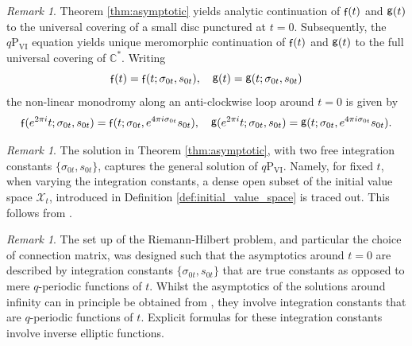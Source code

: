 \documentclass[a4paper,reqno,11pt]{amsart}
\numberwithin{equation}{section}
\numberwithin{figure}{section}
\theoremstyle{plain}
\theoremstyle{remark}
\newtheorem{remark}[theorem]{Remark}
\DeclareMathOperator{\sff}{{\sf f}}
\DeclareMathOperator{\sfg}{{\sf g}}
\newcommand\Psix{\textrm{P}_{\textrm{VI}}}
\numberwithin{rhp}{section}
\begin{document}
\begin{remark}
  Theorem \ref{thm:asymptotic} yields analytic continuation of $\sff(t)$ and $\sfg(t)$ to the universal covering of a small disc punctured at $t=0$. Subsequently, the $q\Psix$ equation yields unique meromorphic continuation of $\sff(t)$ and $\sfg(t)$ to the full universal covering of $\mathbb{C}^*$. Writing
  \begin{equation}\label{eq:solutionsfreeconstants}
      \sff(t)=\sff(t;\sigma_{0t},s_{0t}),\quad \sfg(t)=\sfg(t;\sigma_{0t},s_{0t})
  \end{equation}
  the non-linear monodromy along an anti-clockwise loop around $t=0$ is given by
 \begin{equation*}
      \sff(e^{2\pi i}t;\sigma_{0t},s_{0t})=\sff(t;\sigma_{0t},e^{4\pi i\sigma_{0t}}s_{0t}),\quad \sfg(e^{2\pi i}t;\sigma_{0t},s_{0t})=\sfg(t;\sigma_{0t},e^{4\pi i\sigma_{0t}}s_{0t}).
  \end{equation*}
\end{remark}

\begin{remark}
   The solution in Theorem \ref{thm:asymptotic}, with two free integration constants $\{\sigma_{0t},s_{0t}\}$, captures the general solution of $q\Psix$. Namely, for fixed $t$, when varying the integration constants, a dense open subset of the initial value space $\mathcal{X}_t$, introduced in Definition \ref{def:initial_value_space} is traced out. This follows from \cite[Prop. 2.6 and Thm. 2.14]{roffelsen2024segre}. 
\end{remark}

\begin{remark}
    The set up  of the Riemann-Hilbert problem, and particular the choice of connection matrix, was designed such that the asymptotics around $t=0$ are described by integration constants $\{\sigma_{0t},s_{0t}\}$ that are true constants as opposed to mere $q$-periodic functions of $t$. Whilst the asymptotics of the solutions around infinity can in principle be obtained from \cite[Thm. 2.23]{roffelsen2024segre}, they involve integration constants that are $q$-periodic functions of $t$. Explicit formulas for these integration constants involve inverse elliptic functions.
\end{remark}
\end{document}
